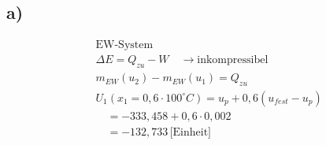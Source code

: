 

\subsection*{a)}

\[
\begin{aligned}
    &\text{EW-System} \\
    &\Delta E = Q_{zu} - W \quad \rightarrow \text{inkompressibel} \\
    &m_{EW}(u_2) - m_{EW}(u_1) = Q_{zu} \\
    &U_1 \left( x_1 = 0,6 \cdot 100^\circ C \right) = u_p + 0,6 (u_{fest} - u_p) \\
    &\quad = -333,458 + 0,6 \cdot 0,002 \\
    &\quad = -132,733 \, \text{[Einheit]}
\end{aligned}
\]